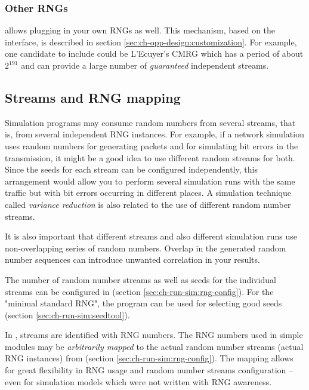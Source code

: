 \subsubsection{Other RNGs}

{\opp} allows plugging in your own RNGs as well. This mechanism,
based on the  interface, is described in section
\ref{sec:ch-opp-design:customization}.
For example, one candidate to include could be L'Ecuyer's CMRG \cite{LEcuyer02}
which has a period of about $2^{191}$ and can provide a large
number of \textit{guaranteed} independent streams.


\subsection{Streams and RNG mapping}

Simulation programs may consume random numbers from several streams,
that is, from several independent RNG instances. For example, if a
network simulation uses random numbers for generating packets and
for simulating bit errors in the transmission, it might be a good
idea to use different random streams for both. Since the seeds
for each stream can be configured independently, this arrangement
would allow you to perform several simulation runs with the same traffic
but with bit errors occurring in different places.
A simulation technique called \textit{variance reduction} is
also related to the use of different random number streams.

It is also important that different streams and also different
simulation runs use non-overlapping series of random numbers.
Overlap in the generated random number sequences can introduce
unwanted correlation in your results.

The number of random number streams as well as seeds for the individual
streams can be configured in 
(section \ref{sec:ch-run-sim:rng-config}).
For the "minimal standard RNG", the  program can be
used for selecting good seeds (section \ref{sec:ch-run-sim:seedtool}).

In {\opp}, streams are identified with RNG numbers. The RNG numbers
used in simple modules may be \textit{arbitrarily mapped} to the actual
random number streams (actual RNG instances) from 
(section \ref{sec:ch-run-sim:rng-config}). The mapping allows
for great flexibility in RNG usage and random number streams
configuration -- even for simulation models which were not written
with RNG awareness.


